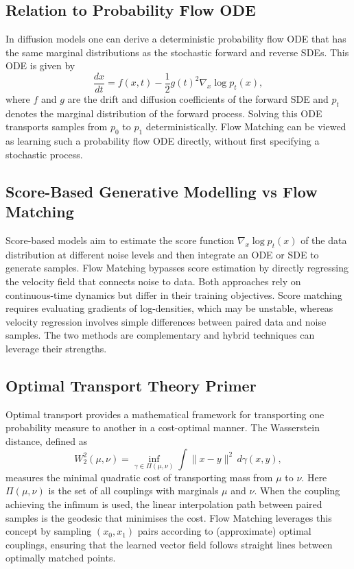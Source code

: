\subsection{Relation to Probability Flow ODE}

In diffusion models one can derive a deterministic probability flow
ODE that has the same marginal distributions as the stochastic
forward and reverse SDEs.  This ODE is given by
\begin{equation}
  \frac{dx}{dt} = f(x,t) - \frac{1}{2}g(t)^2 \nabla_x \log p_t(x),
\end{equation}
where $f$ and $g$ are the drift and diffusion coefficients of the
forward SDE and $p_t$ denotes the marginal distribution of the
forward process.  Solving this ODE transports samples from $p_0$ to
$p_1$ deterministically.  Flow Matching can be viewed as learning
such a probability flow ODE directly, without first specifying a
stochastic process.

\subsection{Score-Based Generative Modelling vs Flow Matching}

Score-based models aim to estimate the score function $\nabla_x\log
p_t(x)$ of the data distribution at different noise levels and then
integrate an ODE or SDE to generate samples.  Flow Matching bypasses
score estimation by directly regressing the velocity field that
connects noise to data.  Both approaches rely on continuous-time
dynamics but differ in their training objectives.  Score matching
requires evaluating gradients of log-densities, which may be
unstable, whereas velocity regression involves simple differences
between paired data and noise samples.  The two methods are
complementary and hybrid techniques can leverage their strengths.

\subsection{Optimal Transport Theory Primer}

Optimal transport provides a mathematical framework for transporting
one probability measure to another in a cost-optimal manner.  The
Wasserstein distance, defined as
\begin{equation}
  W_2^2(\mu,\nu) = \inf_{\gamma\in\Pi(\mu,\nu)}\int\|x-y\|^2\,d\gamma(x,y),
\end{equation}
measures the minimal quadratic cost of transporting mass from $\mu$ to
$\nu$.  Here $\Pi(\mu,\nu)$ is the set of all couplings with
marginals $\mu$ and $\nu$.  When the coupling achieving the infimum is
used, the linear interpolation path between paired samples is the
geodesic that minimises the cost.  Flow Matching leverages this
concept by sampling $(x_0,x_1)$ pairs according to (approximate)
optimal couplings, ensuring that the learned vector field follows
straight lines between optimally matched points.

